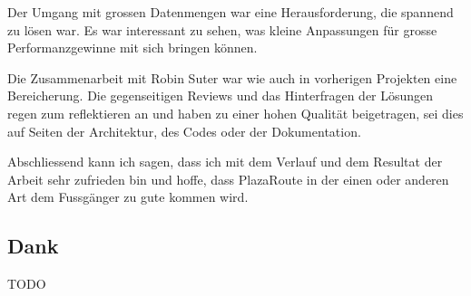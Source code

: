 Der Umgang mit grossen Datenmengen war eine Herausforderung, die spannend zu lösen war. Es war interessant zu sehen, was kleine Anpassungen für grosse Performanzgewinne mit sich bringen können.

Die Zusammenarbeit mit Robin Suter war wie auch in vorherigen Projekten eine Bereicherung. Die gegenseitigen Reviews und das Hinterfragen der Lösungen regen zum reflektieren an und haben zu einer hohen Qualität beigetragen, sei dies auf Seiten der Architektur, des Codes oder der Dokumentation.

Abschliessend kann ich sagen, dass ich mit dem Verlauf und dem Resultat der Arbeit sehr zufrieden bin und hoffe, dass PlazaRoute in der einen oder anderen Art dem Fussgänger zu gute kommen wird.


\subsection{Dank}
\label{sub:Dank}
TODO
